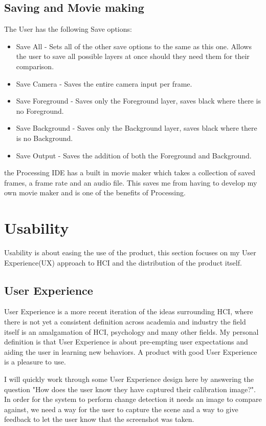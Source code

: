 \documentclass[a4paper]{report}
\begin{document}
\subsection{Saving and Movie making}
The User has the following Save options:

\begin{itemize}
\item Save All - Sets all of the other save options to the same as this one. Allows the user to save all possible layers at once should they need them for their comparison.
\item Save Camera - Saves the entire camera input per frame.
\item Save Foreground - Saves only the Foreground layer, saves black where there is no Foreground.
\item Save Background - Saves only the Background layer, saves black where there is no Background.
\item Save Output - Saves the addition of both the Foreground and Background.
\end{itemize}

the Processing IDE\cite{PROCESSING} has a built in movie maker which takes a collection of saved frames, a frame rate and an audio file. This saves me from having to develop my own movie maker and is one of the benefits of Processing.

\section{Usability}
Usability is about easing the use of the product, this section focuses on my User Experience(UX) approach to HCI and the distribution of the product itself.

\subsection{User Experience}
User Experience is a more recent iteration of the ideas surrounding HCI, where there is not yet a consistent definition across academia and industry the field itself is an amalgamation of HCI, psychology and many other fields. My personal definition is that User Experience is about pre-empting user expectations and aiding the user in learning new behaviors. A product with good User Experience is a pleasure to use. 

I will quickly work through some User Experience design here by answering the question "How does the user know they have captured their calibration image?". In order for the system to perform change detection it needs an image to compare against, we need a way for the user to capture the scene and a way to give feedback to let the user know that the screenshot was taken.
\end{document}
